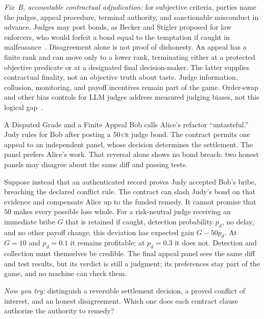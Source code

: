\documentclass[11pt,a4paper]{article}
\theoremstyle{definition}
\theoremstyle{definition}
\theoremstyle{remark}
\begin{document}
\noindent\emph{Fix~B, accountable contractual adjudication:} for subjective
criteria, parties name the judges, appeal procedure, terminal authority, and
sanctionable misconduct in advance. Judges may post bonds, as Becker and
Stigler proposed for law enforcers, who would forfeit a bond equal to the
temptation if caught in malfeasance~. Disagreement
alone is not proof of dishonesty. An appeal has a finite rank and can move
only to a lower rank, terminating either at a protected objective predicate
or at a designated final decision-maker. The latter supplies contractual
finality, not an objective truth about taste. Judge information, collusion,
monitoring, and payoff incentives remain part of the game.
Order-swap and other bias controls for LLM judges address measured judging
biases, not this logical gap~.

\begin{pdexample}{A Disputed Grade and a Finite Appeal}
\setlength{\parskip}{4pt plus 1pt}
Bob calls Alice's refactor ``untasteful.'' Judy rules for Bob after posting
a $50$\,\textsc{cr} judge bond. The contract permits one appeal to an
independent panel, whose decision determines the settlement. The panel
prefers Alice's work. That reversal alone shows no bond breach: two honest
panels may disagree about the same diff and passing tests.

Suppose instead that an authenticated record proves Judy accepted Bob's
bribe, breaching the declared conflict rule. The contract can slash Judy's
bond on that evidence and compensate Alice up to the funded remedy.
It cannot promise that $50$ makes every possible loss whole.
For a risk-neutral judge receiving an immediate bribe $G$ that is retained
if caught, detection probability $p_d$, no delay, and no other payoff change,
this deviation has expected gain $G-50p_d$. At $G=10$ and $p_d=0.1$ it remains
profitable; at $p_d=0.3$ it does not. Detection and collection must themselves
be credible. The final appeal panel sees the same diff and test results, but
its verdict is still a judgment; its preferences stay part of the game, and
no machine can check them.

\emph{Now you try:} distinguish a reversible settlement decision, a proved
conflict of interest, and an honest disagreement. Which one does each
contract clause authorize the authority to remedy?
\end{pdexample}

\pdexercisepointer*{\ref{ex:he-folk-signal-assumption}}{\ref{ex:he-rate-the-raters}}{\pageref{ex:he-folk-signal-assumption}}
\end{document}
